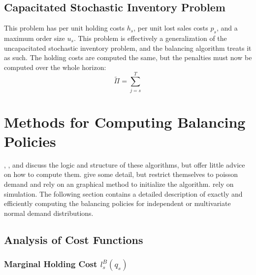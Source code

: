 \documentclass[12pt]{article}
\begin{document}
\subsection{Capacitated Stochastic Inventory Problem}

This problem has per unit holding costs $h_s$, per unit lost sales costs $p_s$, and a maximum order size $u_s$. This problem is effectively a generalization of the uncapacitated stochastic inventory problem, and the balancing algorithm treats it as such. The holding costs are computed the same, but the penalties must now be computed over the whole horizon:
$$
	\tilde{\Pi} = \sum_{j=s}^T 
$$

\section{Methods for Computing Balancing Policies}

\cite{levi:2007}, \cite{levi:2008}, and \cite{levi:2016} discuss the logic and structure of these algorithms, but offer little advice on how to compute them. \cite{yu:2010} give some detail, but restrict themselves to poisson demand and rely on an graphical method to initialize the algorithm. \cite{hurley:2007} rely on simulation. The following section contains a detailed description of exactly and efficiently computing the balancing policies for independent or multivariate normal demand distributions. 

\subsection{Analysis of Cost Functions}

\subsubsection{Marginal Holding Cost $l_s^B(q_s)$}
\end{document}
